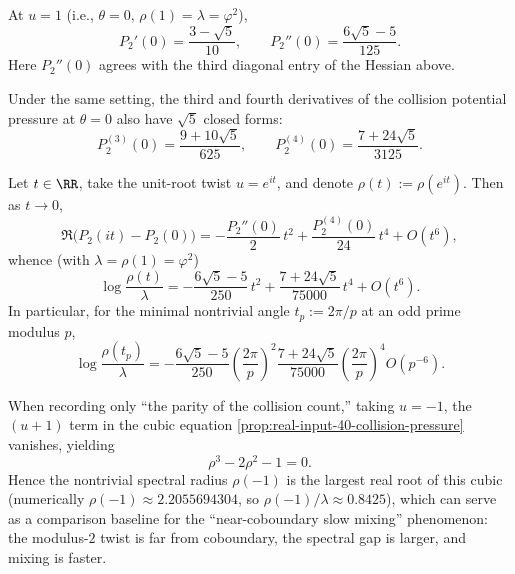 \begin{corollary}\label{cor:real-input-40-collision-cumulants}
At $u=1$ (i.e., $\theta=0$, $\rho(1)=\lambda=\varphi^2$),
\[
P_2'(0)=\frac{3-\sqrt5}{10},
\qquad
P_2''(0)=\frac{6\sqrt5-5}{125}.
\]
Here $P_2''(0)$ agrees with the third diagonal entry of the Hessian above.
\end{corollary}

\begin{corollary}\label{cor:real-input-40-collision-cumulants-higher}
Under the same setting, the third and fourth derivatives of the collision potential pressure at $\theta=0$ also have $\sqrt5$ closed forms:
\[
\boxed{\;
P_2^{(3)}(0)=\frac{9+10\sqrt5}{625},
\qquad
P_2^{(4)}(0)=\frac{7+24\sqrt5}{3125}.
\;}
\]
\end{corollary}

\begin{corollary}\label{cor:real-input-40-collision-twist-fourth}
Let $t\in\RR$, take the unit-root twist $u=e^{it}$, and denote
\(
\rho(t):=\rho(e^{it})
\).
Then as $t\to 0$,
\[
\Re\bigl(P_2(it)-P_2(0)\bigr)
=-\frac{P_2''(0)}{2}\,t^2+\frac{P_2^{(4)}(0)}{24}\,t^4+O(t^6),
\]
whence (with $\lambda=\rho(1)=\varphi^2$)
\[
\boxed{\
\log\frac{\rho(t)}{\lambda}
=-\frac{6\sqrt5-5}{250}\,t^2+\frac{7+24\sqrt5}{75000}\,t^4+O(t^6).
\ }
\]
In particular, for the minimal nontrivial angle $t_p:=2\pi/p$ at an odd prime modulus $p$,
\[
\log\frac{\rho(t_p)}{\lambda}
=-\frac{6\sqrt5-5}{250}\left(\frac{2\pi}{p}\right)^2
\frac{7+24\sqrt5}{75000}\left(\frac{2\pi}{p}\right)^4
O\!\left(p^{-6}\right).
\]
\end{corollary}

\begin{remark}\label{rem:real-input-40-collision-parity}
When recording only ``the parity of the collision count,'' taking $u=-1$, the $(u+1)$ term in the cubic equation \eqref{prop:real-input-40-collision-pressure} vanishes, yielding
\[
\rho^3-2\rho^2-1=0.
\]
Hence the nontrivial spectral radius $\rho(-1)$ is the largest real root of this cubic (numerically $\rho(-1)\approx 2.2055694304$, so $\rho(-1)/\lambda\approx 0.8425$), which can serve as a comparison baseline for the ``near-coboundary slow mixing'' phenomenon: the modulus-$2$ twist is far from coboundary, the spectral gap is larger, and mixing is faster.
\end{remark}

